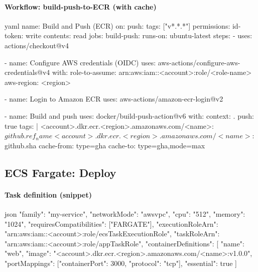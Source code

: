 \documentclass[11pt]{article}
\begin{document}
\paragraph{Workflow: build-push-to-ECR (with cache)}
\begin{code}{yaml}
name: Build and Push (ECR)
on:
  push:
    tags: ["v*.*.*"]
permissions:
  id-token: write
  contents: read
jobs:
  build-push:
    runs-on: ubuntu-latest
    steps:
      - uses: actions/checkout@v4

      - name: Configure AWS credentials (OIDC)
        uses: aws-actions/configure-aws-credentials@v4
        with:
          role-to-assume: arn:aws:iam::<account>:role/<role-name>
          aws-region: <region>

      - name: Login to Amazon ECR
        uses: aws-actions/amazon-ecr-login@v2

      - name: Build and push
        uses: docker/build-push-action@v6
        with:
          context: .
          push: true
          tags: |
            <account>.dkr.ecr.<region>.amazonaws.com/<name>:${{ github.ref_name }}
            <account>.dkr.ecr.<region>.amazonaws.com/<name>:${{ github.sha }}
          cache-from: type=gha
          cache-to: type=gha,mode=max
\end{code}
\clearpage

\subsection{ECS Fargate: Deploy}
\paragraph{Task definition (snippet)}
\begin{code}{json}
{
  "family": "my-service",
  "networkMode": "awsvpc",
  "cpu": "512",
  "memory": "1024",
  "requiresCompatibilities": ["FARGATE"],
  "executionRoleArn": "arn:aws:iam::<account>:role/ecsTaskExecutionRole",
  "taskRoleArn": "arn:aws:iam::<account>:role/appTaskRole",
  "containerDefinitions": [{
    "name": "web",
    "image": "<account>.dkr.ecr.<region>.amazonaws.com/<name>:v1.0.0",
    "portMappings": [{"containerPort": 3000, "protocol": "tcp"}],
    "essential": true
  }]
}
\end{code}
\clearpage
\end{document}
